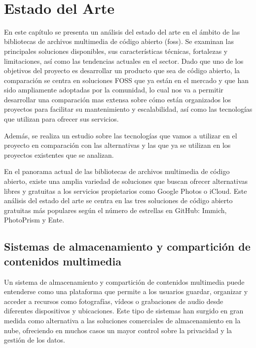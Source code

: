 \newpage
~
\newpage
\chapter{Estado del Arte}

En este capítulo se presenta un análisis del estado del arte en el ámbito de las bibliotecas de archivos multimedia de código abierto (\acrfull{foss}).
Se examinan las principales soluciones disponibles, sus características técnicas, fortalezas y limitaciones, así como las tendencias actuales en el sector.
Dado que uno de los objetivos del proyecto es desarrollar un producto que sea de código abierto, la comparación se centra en soluciones FOSS que ya están en el mercado y que han sido ampliamente adoptadas por la comunidad, lo cual nos va a permitir desarrollar una comparación mas extensa sobre cómo están organizados los proyectos para facilitar su mantenimiento y escalabilidad, así como las tecnologías que utilizan para ofrecer sus servicios.

Además, se realiza un estudio sobre las tecnologías que vamos a utilizar en el proyecto en comparación con las alternativas y las que ya se utilizan en los proyectos existentes que se analizan.

En el panorama actual de las bibliotecas de archivos multimedia de código abierto, existe una amplia variedad de soluciones que buscan ofrecer alternativas libres y gratuitas a los servicios propietarios como Google Photos o iCloud. Este análisis del estado del arte se centra en las tres soluciones de código abierto gratuitas más populares según el número de estrellas en GitHub: Immich, PhotoPrism y Ente.

\section{Sistemas de almacenamiento y compartición de contenidos multimedia}

Un sistema de almacenamiento y compartición de contenidos multimedia puede entenderse como una plataforma que permite a los usuarios guardar, organizar y acceder a recursos como fotografías, vídeos o grabaciones de audio desde diferentes dispositivos y ubicaciones. Este tipo de sistemas han surgido en gran medida como alternativa a las soluciones comerciales de almacenamiento en la nube, ofreciendo en muchos casos un mayor control sobre la privacidad y la gestión de los datos.

